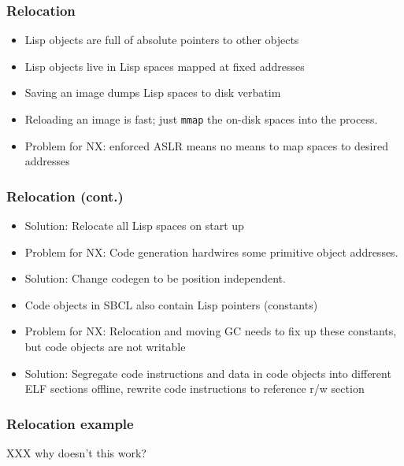 \documentclass[14pt,t,aspectratio=169]{beamer}
\def\code#1{{\color{codecolor}\texttt{#1}}}
\begin{document}
\begin{frame}
  \frametitle{Relocation}
  \begin{itemize}
  \item Lisp objects are full of absolute pointers to other objects
  \item Lisp objects live in Lisp spaces mapped at fixed addresses
  \item Saving an image dumps Lisp spaces to disk verbatim
  \item Reloading an image is fast; just \texttt{mmap} the on-disk
    spaces into the process.
  \item \Rightarrow{} Problem for NX: enforced ASLR means no means to map spaces
    to desired addresses
  \end{itemize}
\end{frame}

\begin{frame}
  \frametitle{Relocation (cont.)}
  \begin{itemize}
    \item Solution: Relocate all Lisp spaces on start up
    \item \Rightarrow{} Problem for NX: Code generation hardwires some primitive
      object addresses.
    \item Solution: Change codegen to be position independent.
    \item Code objects in SBCL also contain Lisp pointers (constants)
    \item \Rightarrow{} Problem for NX: Relocation and moving GC needs to fix up
      these constants, but code objects are not writable
    \item Solution: Segregate code instructions and data in code
      objects into different ELF sections offline, rewrite code
      instructions to reference r/w section
  \end{itemize}
\end{frame}

\begin{frame}
  \frametitle{Relocation example}
  XXX why doesn't this work?

\end{frame}
\end{document}
